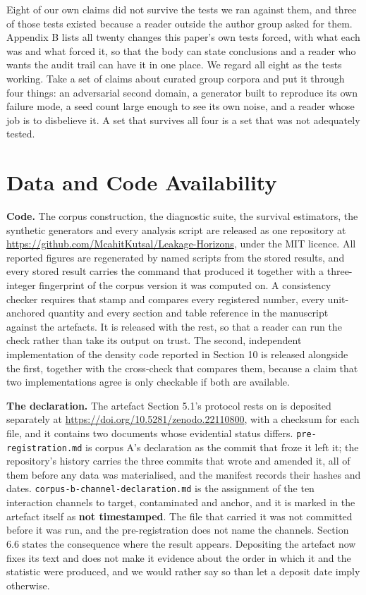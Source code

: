 \documentclass[twoside,11pt]{article}
\begin{document}
Eight of our own claims did not survive the tests we ran against them, and three of those tests existed because a reader outside the author group asked for them. Appendix B lists all twenty changes this paper's own tests forced, with what each was and what forced it, so that the body can state conclusions and a reader who wants the audit trail can have it in one place. We regard all eight as the tests working. Take a set of claims about curated group corpora and put it through four things: an adversarial second domain, a generator built to reproduce its own failure mode, a seed count large enough to see its own noise, and a reader whose job is to disbelieve it. A set that survives all four is a set that was not adequately tested.

\section{Data and Code Availability}

\textbf{Code.} The corpus construction, the diagnostic suite, the survival estimators, the synthetic generators and every analysis script are released as one repository at \url{https://github.com/McahitKutsal/Leakage-Horizons}, under the MIT licence. All reported figures are regenerated by named scripts from the stored results, and every stored result carries the command that produced it together with a three-integer fingerprint of the corpus version it was computed on. A consistency checker requires that stamp and compares every registered number, every unit-anchored quantity and every section and table reference in the manuscript against the artefacts. It is released with the rest, so that a reader can run the check rather than take its output on trust. The second, independent implementation of the density code reported in Section 10 is released alongside the first, together with the cross-check that compares them, because a claim that two implementations agree is only checkable if both are available.

\textbf{The declaration.} The artefact Section 5.1's protocol rests on is deposited separately at \url{https://doi.org/10.5281/zenodo.22110800}, with a checksum for each file, and it contains two documents whose evidential status differs. \texttt{pre-registration.md} is corpus A's declaration as the commit that froze it left it; the repository's history carries the three commits that wrote and amended it, all of them before any data was materialised, and the manifest records their hashes and dates. \texttt{corpus-b-channel-declaration.md} is the assignment of the ten interaction channels to target, contaminated and anchor, and it is marked in the artefact itself as \textbf{not timestamped}. The file that carried it was not committed before it was run, and the pre-registration does not name the channels. Section 6.6 states the consequence where the result appears. Depositing the artefact now fixes its text and does not make it evidence about the order in which it and the statistic were produced, and we would rather say so than let a deposit date imply otherwise.
\end{document}
